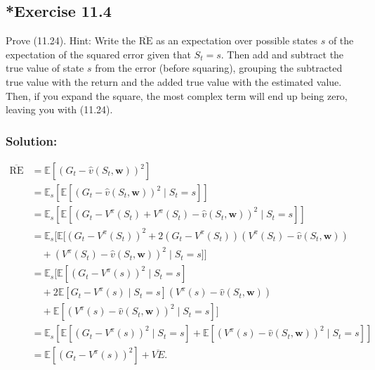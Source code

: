 \subsection*{*Exercise 11.4}

Prove (11.24). Hint: Write the $\overline{\text{RE}}$ as an expectation over possible states
$s$ of the expectation of the squared error given that $S_t = s$. Then add and subtract the
true value of state $s$ from the error (before squaring), grouping the subtracted true value
with the return and the added true value with the estimated value. Then, if you expand
the square, the most complex term will end up being zero, leaving you with (11.24).

\subsubsection*{Solution:}

\begin{align*}
    \overline{\text{RE}} &= \mathbb{E} \left[ \left( G_t - \hat{v}(S_t,\mathbf{w}) \right)^2 \right] \\
    &= \mathbb{E}_s \left[ \mathbb{E} \left[ \left(G_t -  \hat{v}(S_t,\mathbf{w}) \right)^2 \mid S_t = s \right] \right] \\
    &= \mathbb{E}_s \left[ \mathbb{E} \left[ \left(G_t - V^\pi(S_t) + V^\pi(S_t) - \hat{v}(S_t,\mathbf{w}) \right)^2 \mid S_t = s \right] \right] \\
    &= \mathbb{E}_s \Big[ \mathbb{E} \Big[ \left(G_t - V^\pi(S_t) \right)^2 
    + 2 \left(G_t - V^\pi(S_t) \right) \left(V^\pi(S_t) - \hat{v}(S_t,\mathbf{w}) \right)  \\
    &\quad + \left(V^\pi(S_t) - \hat{v}(S_t,\mathbf{w}) \right)^2 \mid S_t = s \Big] \Big] \\
    &= \mathbb{E}_s \Big[\mathbb{E} \left[ \left(G_t - V^\pi(s)\right)^2 \mid S_t = s \right] \\
    &\quad + 2 \mathbb{E} \left[ G_t - V^\pi(s) \mid S_t = s \right] (V^\pi(s) - \hat{v}(S_t,\mathbf{w})) \\
    &\quad + \mathbb{E}\left[ (V^\pi(s) - \hat{v}(S_t,\mathbf{w}))^2 \mid S_t = s \right] \Big] \\
    &= \mathbb{E}_s \left[\mathbb{E} \left[ \left(G_t - V^\pi(s)\right)^2 \mid S_t = s \right] + \mathbb{E}\left[ \left(V^\pi(s) - \hat{v}(S_t,\mathbf{w})\right)^2 \mid S_t = s \right] \right] \\
    &= \mathbb{E} \left[ \left(G_t - V^\pi(s)\right)^2 \right] +  \overline{VE}.
\end{align*}

